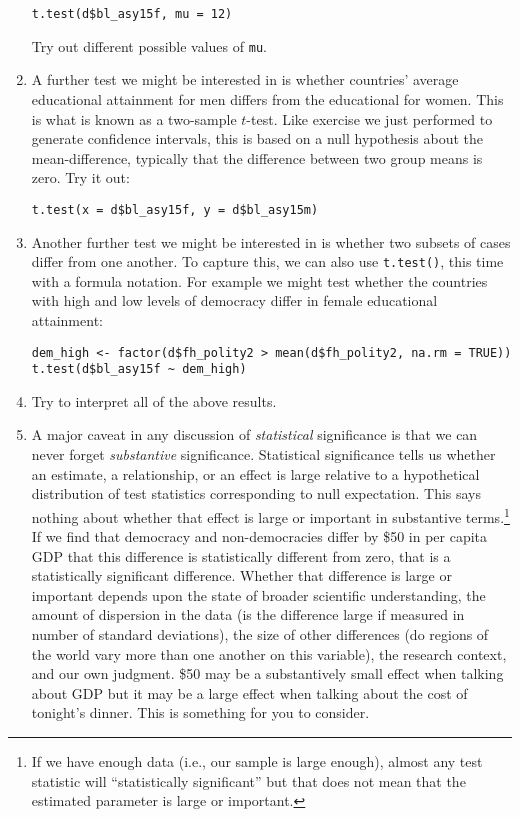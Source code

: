 \documentclass[a4paper,12pt]{article}
\begin{document}
\begin{enumerate}
\begin{verbatim}
t.test(d$bl_asy15f, mu = 12)
\end{verbatim}

\noindent Try out different possible values of \texttt{mu}.

\item A further test we might be interested in is whether countries' average educational attainment for men differs from the educational for women. This is what is known as a two-sample $t$-test. Like exercise we just performed to generate confidence intervals, this is based on a null hypothesis about the mean-difference, typically that the difference between two group means is zero. Try it out:

\begin{verbatim}
t.test(x = d$bl_asy15f, y = d$bl_asy15m)
\end{verbatim}

\item Another further test we might be interested in is whether two subsets of cases differ from one another. To capture this, we can also use \texttt{t.test()}, this time with a formula notation. For example we might test whether the countries with high and low levels of democracy differ in female educational attainment:

\begin{verbatim}
dem_high <- factor(d$fh_polity2 > mean(d$fh_polity2, na.rm = TRUE))
t.test(d$bl_asy15f ~ dem_high)
\end{verbatim}

\item Try to interpret all of the above results.

\item A major caveat in any discussion of \textit{statistical} significance is that we can never forget \textit{substantive} significance. Statistical significance tells us whether an estimate, a relationship, or an effect is large relative to a hypothetical distribution of test statistics corresponding to null expectation. This says nothing about whether that effect is large or important in substantive terms.\footnote{If we have enough data (i.e., our sample is large enough), almost any test statistic will ``statistically significant'' but that does not mean that the estimated parameter is large or important.} If we find that democracy and non-democracies differ by \$50 in per capita GDP that this difference is statistically different from zero, that is a statistically significant difference. Whether that difference is large or important depends upon the state of broader scientific understanding, the amount of dispersion in the data (is the difference large if measured in number of standard deviations), the size of other differences (do regions of the world vary more than one another on this variable), the research context, and our own judgment. \$50 may be a substantively small effect when talking about GDP but it may be a large effect when talking about the cost of tonight's dinner. This is something for you to consider.


\end{enumerate}
\end{document}
